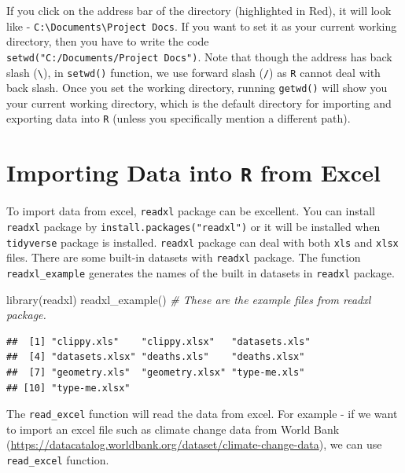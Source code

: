 \documentclass[
]{book}
\newenvironment{Shaded}{\begin{snugshade}}{\end{snugshade}}
\newcommand{\CommentTok}[1]{\textcolor[rgb]{0.56,0.35,0.01}{\textit{#1}}}
\newcommand{\FunctionTok}[1]{\textcolor[rgb]{0.00,0.00,0.00}{#1}}
\newcommand{\NormalTok}[1]{#1}
\begin{document}
If you click on the address bar of the directory (highlighted in Red), it will look like - \texttt{C:\textbackslash{}Documents\textbackslash{}Project\ Docs}. If you want to set it as your current working directory, then you have to write the code \texttt{setwd("C:/Documents/Project\ Docs")}. Note that though the address has back slash (\texttt{\textbackslash{}}), in \texttt{setwd()} function, we use forward slash (\texttt{/}) as \texttt{R} cannot deal with back slash. Once you set the working directory, running \texttt{getwd()} will show you your current working directory, which is the default directory for importing and exporting data into \texttt{R} (unless you specifically mention a different path).

\hypertarget{importing-data-into-r-from-excel}{%
\section{\texorpdfstring{Importing Data into \texttt{R} from Excel}{Importing Data into R from Excel}}\label{importing-data-into-r-from-excel}}

To import data from excel, \texttt{readxl} package can be excellent. You can install \texttt{readxl} package by \texttt{install.packages("readxl")} or it will be installed when \texttt{tidyverse} package is installed. \texttt{readxl} package can deal with both \texttt{xls} and \texttt{xlsx} files. There are some built-in datasets with \texttt{readxl} package. The function \texttt{readxl\_example} generates the names of the built in datasets in \texttt{readxl} package.

\begin{Shaded}
\begin{Highlighting}[]
\FunctionTok{library}\NormalTok{(readxl)}
\FunctionTok{readxl\_example}\NormalTok{() }\CommentTok{\# These are the example files from readxl package. }
\end{Highlighting}
\end{Shaded}

\begin{verbatim}
##  [1] "clippy.xls"    "clippy.xlsx"   "datasets.xls" 
##  [4] "datasets.xlsx" "deaths.xls"    "deaths.xlsx"  
##  [7] "geometry.xls"  "geometry.xlsx" "type-me.xls"  
## [10] "type-me.xlsx"
\end{verbatim}

The \texttt{read\_excel} function will read the data from excel. For example - if we want to import an excel file such as climate change data from World Bank (\url{https://datacatalog.worldbank.org/dataset/climate-change-data}), we can use \texttt{read\_excel} function.
\end{document}
